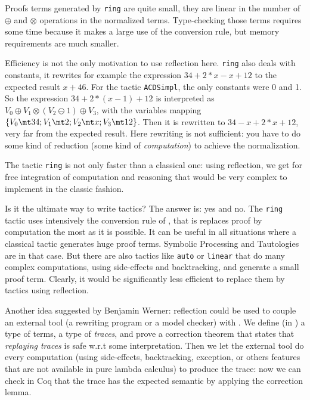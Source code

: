 Proofs terms generated by \texttt{ring} are quite small, they are
linear in the number of $\oplus$ and $\otimes$ operations in the
normalized terms. Type-checking those terms requires some time because it
makes a large use of the conversion rule, but
memory requirements are much smaller. 

\label{DiscussReflection}

Efficiency is not the only motivation to use reflection
here. \texttt{ring} also deals with constants, it rewrites for example the
expression $34 + 2*x -x + 12$ to the expected result $x + 46$. For the
tactic \texttt{ACDSimpl}, the only constants were 0 and 1. So the
expression $34 + 2*(x - 1) + 12$ is interpreted as 
$V_0 \oplus V_1 \otimes (V_2 \ominus 1) \oplus V_3$, 
with the variables mapping 
$\{V_0 \mt 34; V_1 \mt 2; V_2 \mt x; V_3 \mt 12 \}$. Then it is
rewritten to $34 - x + 2*x + 12$, very far from the expected
result. Here rewriting is not sufficient: you have to do some kind of
reduction (some kind of \textit{computation}) to achieve the
normalization.

The tactic \texttt{ring} is not only faster than a classical one:
using reflection, we get for free integration of computation and
reasoning that would be very complex to implement in the classic fashion.

Is it the ultimate way to write tactics?  The answer is: yes and
no. The \texttt{ring} tactic uses intensively the conversion rule of
\CIC, that is replaces proof by computation the most as it is
possible. It can be useful in all situations where a classical tactic
generates huge proof terms. Symbolic Processing and Tautologies are in
that case. But there are also tactics like \texttt{auto} or
\texttt{linear} that do many complex computations, using side-effects
and backtracking, and generate a small proof term. Clearly, it would
be significantly less efficient to replace them by tactics using
reflection.

Another idea suggested by Benjamin Werner: reflection could be used to
couple an external tool (a rewriting program or a model checker) with
\Coq. We define (in \Coq) a type of terms, a type of \emph{traces},
and prove a correction theorem that states that \emph{replaying
traces} is safe w.r.t some interpretation. Then we let the external
tool do every computation (using side-effects, backtracking,
exception, or others features that are not available in pure lambda
calculus) to produce the trace: now we can check in Coq{} that the
trace has the expected semantic by applying the correction lemma.
 
